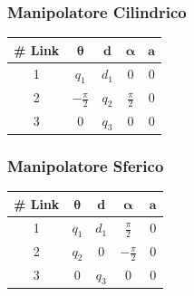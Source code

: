 ﻿\documentclass[11pt, a4paper]{article}
\begin{document}
\begin{minipage}[t]{0.48\textwidth}
    \subsubsection*{Manipolatore Cilindrico}
    \centering
    \begin{tabular}{|c|c|c|c|c|}
        \hline
        \textbf{\# Link} & \(\boldsymbol{\theta}\) & \(\boldsymbol{d}\) & \(\boldsymbol{\alpha}\) & \(\boldsymbol{a}\) \\
        \hline
        1 & \(q_{1}\) & \(d_{1}\) & 0 & 0 \\
        \hline
        2 & \(-\frac{\pi}{2}\) & \(q_{2}\) & \(\frac{\pi}{2}\) & 0\\
        \hline
        3 & 0 & \(q_{3}\) & 0 & 0 \\
        \hline
    \end{tabular}

\end{minipage}
\hfill
\begin{minipage}[t]{0.48\textwidth}
    \subsubsection*{Manipolatore Sferico}
    \centering
    \begin{tabular}{|c|c|c|c|c|}
        \hline
        \textbf{\# Link} & \(\boldsymbol{\theta}\) & \(\boldsymbol{d}\) & \(\boldsymbol{\alpha}\) & \(\boldsymbol{a}\) \\
        \hline
        1 & \(q_{1}\) & \(d_{1}\) & \(\frac{\pi}{2}\) & 0 \\
        \hline
        2 & \(q_{2}\) & 0 & \(-\frac{\pi}{2}\) & 0\\
        \hline
        3 & 0 & \(q_{3}\) & 0 & 0 \\
        \hline
    \end{tabular}
\end{minipage}

\vspace{1cm} %
\end{document}

